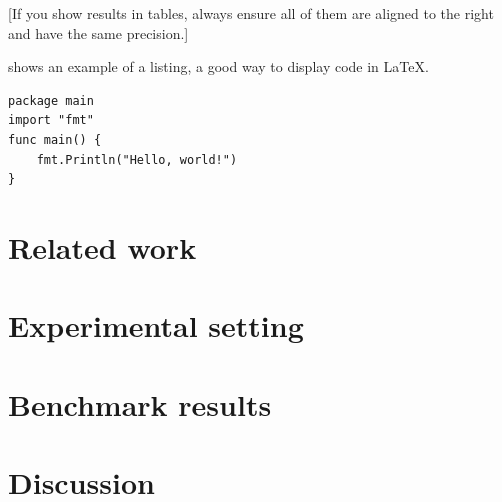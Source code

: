 [If you show results in tables, always ensure all of them are aligned to the right and have the same precision.]

 shows an example of a listing, a good way to display code in \LaTeX.

\begin{listing}[th]
	\begin{verbatim}
package main
import "fmt"
func main() {
	fmt.Println("Hello, world!")
}
	\end{verbatim}
\caption{"Hello, world!" in Go}
\label{lst:hello}
\end{listing}
\fi

\section{Related work}


\pagebreak
\section{Experimental setting}


\pagebreak
\section{Benchmark results}


\pagebreak
\section{Discussion}

\lipsum[2]

